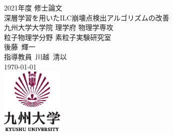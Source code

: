 \documentclass[12pt, openany]{jsbook}
\begin{document}
\begin{titlepage}
 \begin{center}
  {\Large 2021年度 修士論文} \\ 
  \vspace*{125pt}
  {\Large 深層学習を用いたILC崩壊点検出アルゴリズムの改善}\\[11pt]
  {\large 九州大学大学院 理学府 物理学専攻 \\ 粒子物理学分野 素粒子実験研究室} \\[15pt]
  \vspace{40pt}
  {\large  後藤\ 輝一 \\[1ex] 指導教員\ 川越\ 清以 } \\[1em]
  \today\\
 \vspace{100pt}
  \includegraphics[width=3cm]{Figure/1Introduction/KyushuUniversityLogo.eps}
 \end{center}
\end{titlepage}

\thispagestyle{empty}　\newpage

\thispagestyle{empty}　\newpage
\pagestyle{headings}
\tableofcontents
\listoffigures
\listoftables











\end{document}
